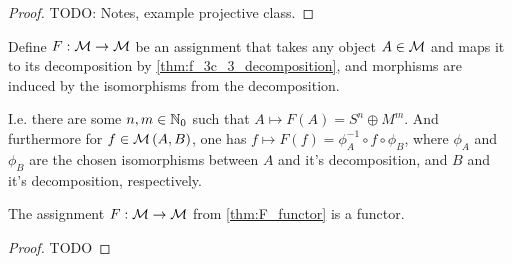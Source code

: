 \begin{lemma}
\begin{enumerate}
{\begin{center}
            \end{center}
        }
    \end{enumerate}
\end{lemma}
\begin{proof}
    TODO: Notes, example projective class.
\end{proof}





\begin{definition} \label{thm:F_functor} %
    Define \( F: {\mathcal{M}} \to {\mathcal{M}} \) be an assignment that takes any object \( A \in {\mathcal{M}} \) and maps it to its decomposition by \autoref{thm:f_3c_3_decomposition}, and morphisms are induced by the isomorphisms from the decomposition. 
    
    I.e. there are some \( n, m \in {\mathbb{N}}_0 \) such that \( A \mapsto F(A) = S^n \oplus M^m \). And furthermore for \( f \in {\mathcal{M}}\left( A, B \right) \), one has \( f \mapsto F(f) = \phi_A^{-1} \circ f \circ \phi_B \), where \( \phi_A \) and \( \phi_B \) are the chosen isomorphisms between \( A \) and it's decomposition, and \( B \) and it's decomposition, respectively.
\end{definition}

\begin{lemma}
    The assignment \( F: {\mathcal{M}} \to {\mathcal{M}} \) from \autoref{thm:F_functor} is a functor.
\end{lemma}
\begin{proof}
    TODO
\end{proof}

